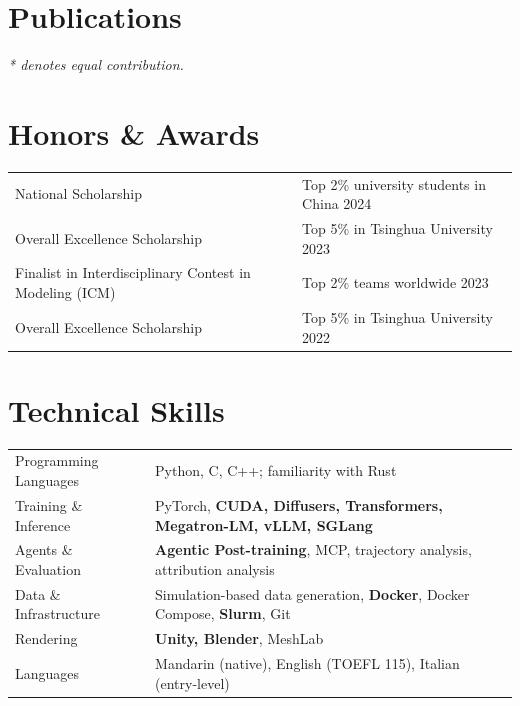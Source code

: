 \documentclass[a4paper,10pt]{article}
\begin{document}
\newpage
{}
\section{Publications}
{\small\textit{* denotes equal contribution.}}
\begin{refsection}
\nocite{*}
\printbibliography[heading=none]
\end{refsection}



\section{Honors \& Awards}
\begin{tabularx}{\linewidth}{@{}l X@{}}
National Scholarship & Top 2\% university students in China \hfill 2024 \\[4pt]

Overall Excellence Scholarship & Top 5\% in Tsinghua University \hfill 2023 \\[4pt]

Finalist in Interdisciplinary Contest in Modeling (ICM) & Top 2\% teams worldwide \hfill 2023 \\[4pt]

Overall Excellence Scholarship & Top 5\% in Tsinghua University \hfill 2022
\end{tabularx}

\section{Technical Skills}
\begin{tabularx}{\linewidth}{@{}l X@{}}
Programming Languages & Python, C, C++; familiarity with Rust \\[4pt]
Training \& Inference & PyTorch, \textbf{CUDA, Diffusers, Transformers, Megatron-LM, vLLM, SGLang} \\[4pt]
Agents \& Evaluation & \textbf{Agentic Post-training}, MCP, trajectory analysis, attribution analysis \\[4pt]
Data \& Infrastructure & Simulation-based data generation, \textbf{Docker}, Docker Compose, \textbf{Slurm}, Git \\[4pt]
Rendering & \textbf{Unity, Blender}, MeshLab \\[4pt]
Languages & Mandarin (native), English (TOEFL 115), Italian (entry-level) \\[4pt]
\end{tabularx}

\vfill
{}
\end{document}
